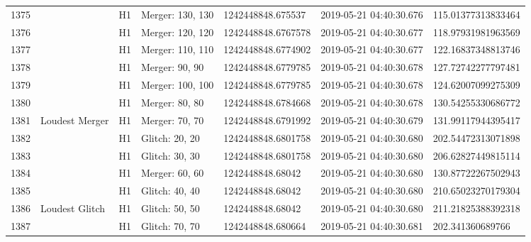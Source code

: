 \begin{longtable}{lllllll}
1375 &                                                    &       H1 &  Merger: 130, 130 &   1242448848.675537 &  2019-05-21 04:40:30.676 &  115.01377313833464 \\
1376 &                                                    &       H1 &  Merger: 120, 120 &  1242448848.6767578 &  2019-05-21 04:40:30.677 &  118.97931981963569 \\
1377 &                                                    &       H1 &  Merger: 110, 110 &  1242448848.6774902 &  2019-05-21 04:40:30.677 &  122.16837348813746 \\
1378 &                                                    &       H1 &    Merger: 90, 90 &  1242448848.6779785 &  2019-05-21 04:40:30.678 &  127.72742277797481 \\
1379 &                                                    &       H1 &  Merger: 100, 100 &  1242448848.6779785 &  2019-05-21 04:40:30.678 &  124.62007099275309 \\
1380 &                                                    &       H1 &    Merger: 80, 80 &  1242448848.6784668 &  2019-05-21 04:40:30.678 &  130.54255330686772 \\
1381 &                                     Loudest Merger &       H1 &    Merger: 70, 70 &  1242448848.6791992 &  2019-05-21 04:40:30.679 &  131.99117944395417 \\
1382 &                                                    &       H1 &    Glitch: 20, 20 &  1242448848.6801758 &  2019-05-21 04:40:30.680 &  202.54472313071898 \\
1383 &                                                    &       H1 &    Glitch: 30, 30 &  1242448848.6801758 &  2019-05-21 04:40:30.680 &  206.62827449815114 \\
1384 &                                                    &       H1 &    Merger: 60, 60 &    1242448848.68042 &  2019-05-21 04:40:30.680 &  130.87722267502943 \\
1385 &                                                    &       H1 &    Glitch: 40, 40 &    1242448848.68042 &  2019-05-21 04:40:30.680 &  210.65023270179304 \\
1386 &                                     Loudest Glitch &       H1 &    Glitch: 50, 50 &    1242448848.68042 &  2019-05-21 04:40:30.680 &  211.21825388392318 \\
1387 &                                                    &       H1 &    Glitch: 70, 70 &   1242448848.680664 &  2019-05-21 04:40:30.681 &    202.341360689766 \\

\end{longtable}
